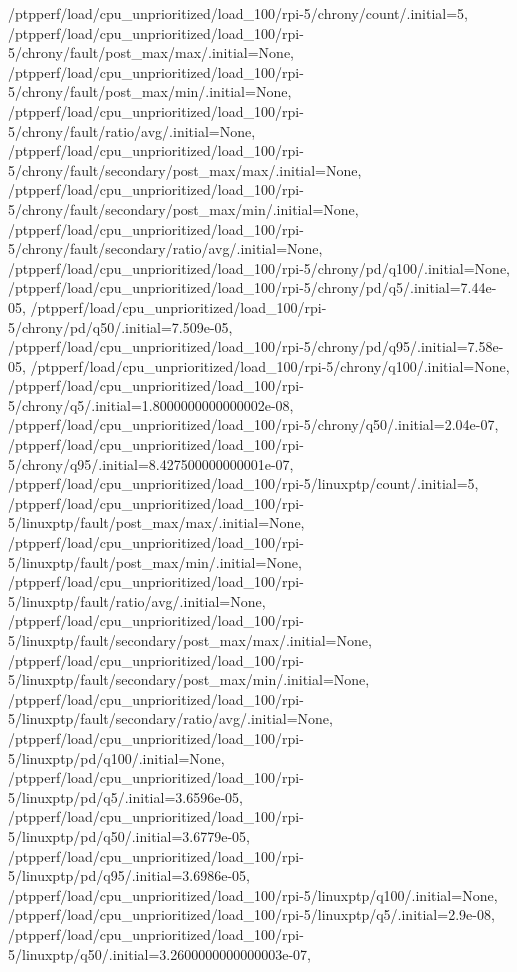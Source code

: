 {    /ptpperf/load/cpu_unprioritized/load_100/rpi-5/chrony/count/.initial=5,
    /ptpperf/load/cpu_unprioritized/load_100/rpi-5/chrony/fault/post_max/max/.initial=None,
    /ptpperf/load/cpu_unprioritized/load_100/rpi-5/chrony/fault/post_max/min/.initial=None,
    /ptpperf/load/cpu_unprioritized/load_100/rpi-5/chrony/fault/ratio/avg/.initial=None,
    /ptpperf/load/cpu_unprioritized/load_100/rpi-5/chrony/fault/secondary/post_max/max/.initial=None,
    /ptpperf/load/cpu_unprioritized/load_100/rpi-5/chrony/fault/secondary/post_max/min/.initial=None,
    /ptpperf/load/cpu_unprioritized/load_100/rpi-5/chrony/fault/secondary/ratio/avg/.initial=None,
    /ptpperf/load/cpu_unprioritized/load_100/rpi-5/chrony/pd/q100/.initial=None,
    /ptpperf/load/cpu_unprioritized/load_100/rpi-5/chrony/pd/q5/.initial=7.44e-05,
    /ptpperf/load/cpu_unprioritized/load_100/rpi-5/chrony/pd/q50/.initial=7.509e-05,
    /ptpperf/load/cpu_unprioritized/load_100/rpi-5/chrony/pd/q95/.initial=7.58e-05,
    /ptpperf/load/cpu_unprioritized/load_100/rpi-5/chrony/q100/.initial=None,
    /ptpperf/load/cpu_unprioritized/load_100/rpi-5/chrony/q5/.initial=1.8000000000000002e-08,
    /ptpperf/load/cpu_unprioritized/load_100/rpi-5/chrony/q50/.initial=2.04e-07,
    /ptpperf/load/cpu_unprioritized/load_100/rpi-5/chrony/q95/.initial=8.427500000000001e-07,
    /ptpperf/load/cpu_unprioritized/load_100/rpi-5/linuxptp/count/.initial=5,
    /ptpperf/load/cpu_unprioritized/load_100/rpi-5/linuxptp/fault/post_max/max/.initial=None,
    /ptpperf/load/cpu_unprioritized/load_100/rpi-5/linuxptp/fault/post_max/min/.initial=None,
    /ptpperf/load/cpu_unprioritized/load_100/rpi-5/linuxptp/fault/ratio/avg/.initial=None,
    /ptpperf/load/cpu_unprioritized/load_100/rpi-5/linuxptp/fault/secondary/post_max/max/.initial=None,
    /ptpperf/load/cpu_unprioritized/load_100/rpi-5/linuxptp/fault/secondary/post_max/min/.initial=None,
    /ptpperf/load/cpu_unprioritized/load_100/rpi-5/linuxptp/fault/secondary/ratio/avg/.initial=None,
    /ptpperf/load/cpu_unprioritized/load_100/rpi-5/linuxptp/pd/q100/.initial=None,
    /ptpperf/load/cpu_unprioritized/load_100/rpi-5/linuxptp/pd/q5/.initial=3.6596e-05,
    /ptpperf/load/cpu_unprioritized/load_100/rpi-5/linuxptp/pd/q50/.initial=3.6779e-05,
    /ptpperf/load/cpu_unprioritized/load_100/rpi-5/linuxptp/pd/q95/.initial=3.6986e-05,
    /ptpperf/load/cpu_unprioritized/load_100/rpi-5/linuxptp/q100/.initial=None,
    /ptpperf/load/cpu_unprioritized/load_100/rpi-5/linuxptp/q5/.initial=2.9e-08,
    /ptpperf/load/cpu_unprioritized/load_100/rpi-5/linuxptp/q50/.initial=3.2600000000000003e-07,
}
